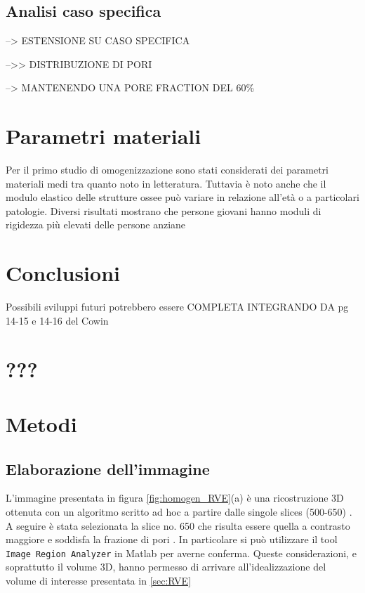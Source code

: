 \documentclass[a4paper,num-refs]{oup-contemporary}
\begin{document}
\subsection{Analisi caso specifica}


--> ESTENSIONE SU CASO SPECIFICA 

-->> DISTRIBUZIONE DI PORI 

--> MANTENENDO UNA PORE FRACTION DEL 60\%

\section{Parametri materiali}
\label{sec:variazioni_materiali}



Per il primo studio di omogenizzazione sono stati considerati dei parametri materiali medi tra quanto noto in letteratura. Tuttavia è noto anche che il modulo elastico delle strutture ossee può variare in relazione all'età o a particolari patologie. Diversi risultati mostrano che persone giovani hanno moduli di rigidezza più elevati delle persone anziane \citep{Cowin1}




\section{Conclusioni}

Possibili sviluppi futuri potrebbero essere COMPLETA INTEGRANDO DA pg 14-15 e 14-16 del Cowin

\section{???}


\section{Metodi}

\subsection{Elaborazione dell'immagine}

L'immagine presentata in figura \ref{fig:homogen_RVE}(a) è una ricostruzione 3D ottenuta con un algoritmo scritto ad hoc \citep{Mastrofini:21} a partire dalle singole slices (500-650) \citep{ESA:2005}. A seguire è stata selezionata la slice no. 650 che risulta essere quella a contrasto maggiore e soddisfa la frazione di pori \citep{CC21}. In particolare si può utilizzare il tool 
\texttt{Image Region Analyzer} in Matlab per averne conferma. Queste considerazioni, e soprattutto il volume 3D, hanno permesso di arrivare all'idealizzazione del volume di interesse presentata in  \cref{sec:RVE}
\end{document}
